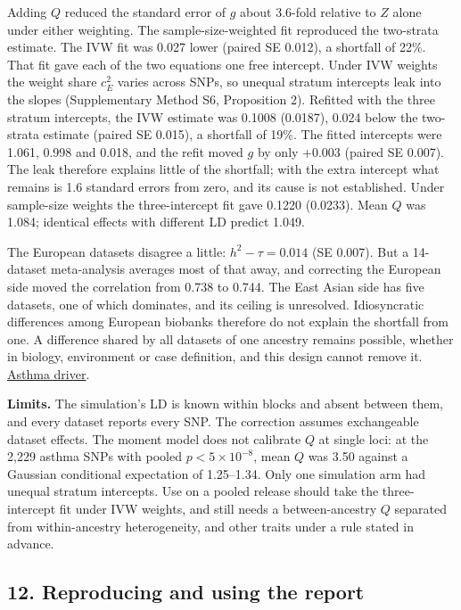 \documentclass[11pt,a4paper]{article}
\let\reportsection\subsection
\newif\ifinsupplement
\renewcommand{\subsection}[1]{\clearpage
  \ifstrequal{#1}{Supplementary Methods}{\insupplementtrue
    \fancyhead[R]{\small\sffamily Supplementary methods}}{}
  \reportsection{#1}}
\begin{document}
Adding \(Q\) reduced the standard error of \(g\) about 3.6-fold relative to \(Z\) alone under either weighting. The sample-size-weighted fit reproduced the two-strata estimate. The IVW fit was 0.027 lower (paired SE 0.012), a shortfall of 22\%. That fit gave each of the two equations one free intercept. Under IVW weights the weight share \(c_E^2\) varies across SNPs, so unequal stratum intercepts leak into the slopes (Supplementary Method S6, Proposition 2). Refitted with the three stratum intercepts, the IVW estimate was 0.1008 (0.0187), 0.024 below the two-strata estimate (paired SE 0.015), a shortfall of 19\%. The fitted intercepts were 1.061, 0.998 and 0.018, and the refit moved \(g\) by only +0.003 (paired SE 0.007). The leak therefore explains little of the shortfall; with the extra intercept what remains is 1.6 standard errors from zero, and its cause is not established. Under sample-size weights the three-intercept fit gave 0.1220 (0.0233). Mean \(Q\) was 1.084; identical effects with different LD predict 1.049.

The European datasets disagree a little: \(h^2-\tau=0.014\) (SE 0.007). But a 14-dataset meta-analysis averages most of that away, and correcting the European side moved the correlation from 0.738 to 0.744. The East Asian side has five datasets, one of which dominates, and its ceiling is unresolved. Idiosyncratic differences among European biobanks therefore do not explain the shortfall from one. A difference shared by all datasets of one ancestry remains possible, whether in biology, environment or case definition, and this design cannot remove it. \href{../experiments/gbmi_asthma_heterogeneity.py}{Asthma driver}.

\textbf{Limits.} The simulation's LD is known within blocks and absent between them, and every dataset reports every SNP. The correction assumes exchangeable dataset effects. The moment model does not calibrate \(Q\) at single loci: at the 2,229 asthma SNPs with pooled \(p<5\times10^{-8}\), mean \(Q\) was 3.50 against a Gaussian conditional expectation of 1.25--1.34. Only one simulation arm had unequal stratum intercepts. Use on a pooled release should take the three-intercept fit under IVW weights, and still needs a between-ancestry \(Q\) separated from within-ancestry heterogeneity, and other traits under a rule stated in advance.

\subsection{12. Reproducing and using the report}\label{12-reproducing-and-using-the-report}
\end{document}
